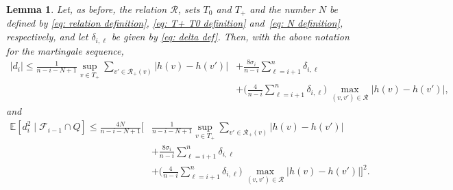 \documentclass[12pt]{article}
\newtheorem{lemma}[theorem]{Lemma}
\theoremstyle{definition}
\theoremstyle{plain}
\newcommand{\E}{\mathbb{E}}
\def\relation{{\mathcal R}}
\begin{document}
\begin{lemma}\label{lem-estimate-diff}
Let, as before, the relation $\relation$, sets $T_0$ and $T_+$ and the number $N$
be defined by \eqref{eq: relation definition}, \eqref{eq: T+ T0 definition} and~\eqref{eq: N definition},
respectively, and let $\delta_{i,\ell}$ be given by \eqref{eq: delta def}.
Then, with the above notation for the martingale sequence,
\begin{align*}
\vert d_i\vert\leq
\frac{1}{n-i-N+1}\sup\limits_{v\in T_+}\sum\limits_{v'\in \relation_+(v)}\big|h(v)-h(v')\big|
&+\frac{8\sigma_i}{n-i} \sum_{\ell=i+1}^n \delta_{i,\ell}\\
&+\Big(\frac{4}{n-i} \sum_{\ell=i+1}^n \delta_{i,\ell}\Big)\, \max_{(v,v')\in \relation} \big\vert h(v)-h(v')\big\vert,
\end{align*}
and 
\begin{align*}
\E [d_i^2\mid\mathcal{F}_{i-1}\cap Q]
\leq \frac{4N}{n-i-N+1}
\Big[&\frac{1}{n-i-N+1}\sup\limits_{v\in T_+}\sum\limits_{v'\in \relation_+(v)}\big|h(v)-h(v')\big|\\
&+\frac{8\sigma_i}{n-i} \sum_{\ell=i+1}^n \delta_{i,\ell}\\
&+\Big(\frac{4}{n-i} \sum_{\ell=i+1}^n \delta_{i,\ell}\Big)\, \max_{(v,v')\in \relation} \big\vert h(v)-h(v')\big\vert\Big]^2.
\end{align*}
\end{lemma} 
\end{document}
